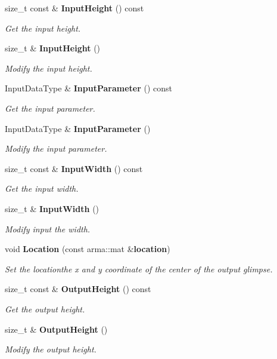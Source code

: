 \begin{DoxyCompactItemize}
size\+\_\+t const \& {\bf Input\+Height} () const 
\begin{DoxyCompactList}\small\item\em Get the input height. \end{DoxyCompactList}\item 
size\+\_\+t \& {\bf Input\+Height} ()
\begin{DoxyCompactList}\small\item\em Modify the input height. \end{DoxyCompactList}\item 
Input\+Data\+Type \& {\bf Input\+Parameter} () const 
\begin{DoxyCompactList}\small\item\em Get the input parameter. \end{DoxyCompactList}\item 
Input\+Data\+Type \& {\bf Input\+Parameter} ()
\begin{DoxyCompactList}\small\item\em Modify the input parameter. \end{DoxyCompactList}\item 
size\+\_\+t const \& {\bf Input\+Width} () const 
\begin{DoxyCompactList}\small\item\em Get the input width. \end{DoxyCompactList}\item 
size\+\_\+t \& {\bf Input\+Width} ()
\begin{DoxyCompactList}\small\item\em Modify input the width. \end{DoxyCompactList}\item 
void {\bf Location} (const arma\+::mat \&{\bf location})
\begin{DoxyCompactList}\small\item\em Set the locationthe x and y coordinate of the center of the output glimpse. \end{DoxyCompactList}\item 
size\+\_\+t const \& {\bf Output\+Height} () const 
\begin{DoxyCompactList}\small\item\em Get the output height. \end{DoxyCompactList}\item 
size\+\_\+t \& {\bf Output\+Height} ()
\begin{DoxyCompactList}\small\item\em Modify the output height. \end{DoxyCompactList}\item 

\end{DoxyCompactItemize}
